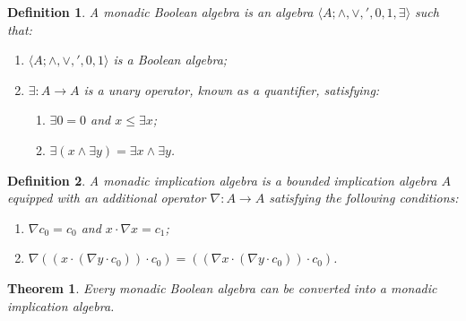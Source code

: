 \documentclass[10pt,a4paper]{amsart}
\newtheorem{theorem}{Theorem}
\newtheorem{definition}{Definition}
\begin{document}
\begin{definition}\label{monadic ortholattice}
A \emph{monadic Boolean algebra} is an algebra $\langle A;\wedge,\vee,',0,1,\exists\rangle$ such that: 
\begin{enumerate}
    \item $\langle A;\wedge,\vee,',0,1\rangle$ is a Boolean algebra;
    \item $\exists\colon A\to A$ is a unary operator, known as a \emph{quantifier}, satisfying:
        \begin{enumerate}
        \item $\exists 0=0$ and $x\leq \exists x$;
        \item $\exists(x\wedge\exists y)=\exists x\wedge\exists y$. 
    \end{enumerate}
\end{enumerate}
\end{definition}

\begin{definition}\label{mbia}
    A \emph{monadic implication algebra} is a bounded implication algebra $A$ equipped with an additional operator $\nabla\colon A\to A$ satisfying the following conditions: 
    \begin{enumerate} 
        \item $\nabla c_0=c_0$ and $x\cdot\nabla x=c_1$;
        \item $\nabla((x\cdot(\nabla y\cdot c_0))\cdot c_0)=((\nabla x\cdot(\nabla y\cdot c_0))\cdot c_0)$. 
    \end{enumerate}
\end{definition}

\begin{theorem}\label{mba to mia}
    Every monadic Boolean algebra can be converted into a monadic implication algebra. 
\end{theorem}
\end{document}
